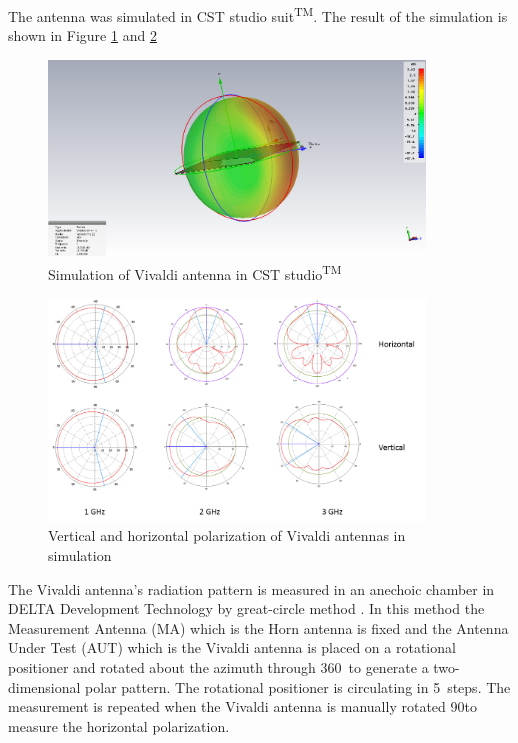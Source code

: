 The antenna was simulated in CST studio suit\textsuperscript{TM}. The result of the simulation is shown in Figure \ref{fig:Simulation_1G} and \ref{fig:Simulation} 
\begin{figure}[!]
    \centering
    \includegraphics[width=100mm]{Vivaldi/farfield1GScale.PNG}
    \caption{Simulation of Vivaldi antenna in CST studio\textsuperscript{TM}}
    \label{fig:Simulation_1G}
\end{figure}

\begin{figure}
    \centering
    \includegraphics[width=100mm]{Vivaldi/SimulatedAntennas.PNG}
    \caption{Vertical and horizontal polarization of Vivaldi antennas in simulation}
    \label{fig:Simulation}
\end{figure}

The Vivaldi antenna's radiation pattern is measured in an anechoic chamber in DELTA Development Technology by great-circle method \cite{FoegelleAntennaPattern}. In this method the Measurement Antenna (MA) which is the Horn antenna is fixed and the Antenna Under Test (AUT) which is the Vivaldi antenna is placed on a rotational positioner and rotated about the azimuth through 360\textdegree~to generate a two-dimensional polar pattern. The rotational positioner is circulating in 5\textdegree~steps.  The measurement is repeated when the Vivaldi antenna is manually rotated 90\textdegree   to measure the horizontal polarization.

